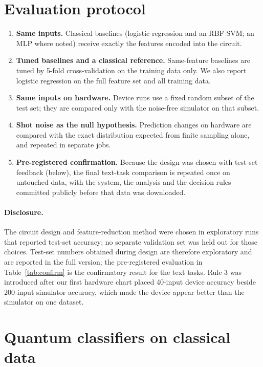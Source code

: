 \documentclass[11pt]{article}
\begin{document}
\section{Evaluation protocol}\label{sec:protocol}
\begin{enumerate}
  \item \textbf{Same inputs.} Classical baselines (logistic regression and an RBF SVM; an MLP where noted) receive exactly the features encoded into the circuit.
  \item \textbf{Tuned baselines and a classical reference.} Same-feature baselines are tuned by 5-fold cross-validation on the training data only. We also report logistic regression on the full feature set and all training data.
  \item \textbf{Same inputs on hardware.} Device runs use a fixed random subset of the test set; they are compared only with the noise-free simulator on that subset.
  \item \textbf{Shot noise as the null hypothesis.} Prediction changes on hardware are compared with the exact distribution expected from finite sampling alone, and repeated in separate jobs.
  \item \textbf{Pre-registered confirmation.} Because the design was chosen with test-set feedback (below), the final text-task comparison is repeated once on untouched data, with the system, the analysis and the decision rules committed publicly before that data was downloaded.
\end{enumerate}
\paragraph{Disclosure.} The circuit design and feature-reduction method were chosen in exploratory runs that reported test-set accuracy; no separate validation set was held out for those choices. Test-set numbers obtained during design are therefore exploratory and are reported in the full version; the pre-registered evaluation in Table~\ref{tab:confirm} is the confirmatory result for the text tasks. Rule 3 was introduced after our first hardware chart placed 40-input device accuracy beside 200-input simulator accuracy, which made the device appear better than the simulator on one dataset.


\section{Quantum classifiers on classical data}\label{sec:classical}
\end{document}
